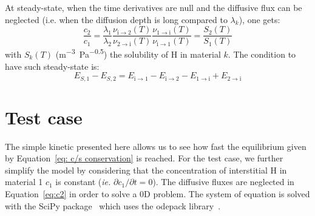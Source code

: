 \indent At steady-state, when the time derivatives are null and the diffusive flux can be neglected (i.e. when the diffusion depth is long compared to $\lambda_k$), one gets:
\begin{equation}
     \frac{c_2}{c_1}=\frac{\lambda_1}{\lambda_2}\frac{\nu_\mathrm{i\rightarrow2}(T)}{\nu_\mathrm{2\rightarrow i}(T)}\frac{\nu_\mathrm{1\rightarrow i}(T)}{\nu_\mathrm{i\rightarrow 1}(T)} = \frac{S_2(T)}{S_1(T)}
\end{equation}
with $S_k(T)$ (\si{m^{-3}.Pa^{-0.5}}) the solubility of H in material $k$.
The condition to have such steady-state is:
\begin{equation}
    E_{S,1}-E_{S,2} = E_\mathrm{i\rightarrow 1}-E_\mathrm{i\rightarrow 2}-E_\mathrm{1\rightarrow i} +E_\mathrm{2\rightarrow i}
    \label{eq:steady}
\end{equation}

\section{Test case}
\indent The simple kinetic presented here allows us to see how fast the equilibrium given by Equation~\ref{eq: c/s conservation} is reached.
For the test case, we further simplify the model by considering that the concentration of interstitial H in material 1 $c_1$ is constant (\textit{ie.} $\partial c_1/\partial t=0$).
The diffusive fluxes are neglected in Equation~\ref{eq:c2} in order to solve a 0D problem.
The system of equation is solved with the SciPy package~\cite{virtanen_scipy_2020} which uses the odepack library~\cite{hindmarch_odepack_1982}.\\

